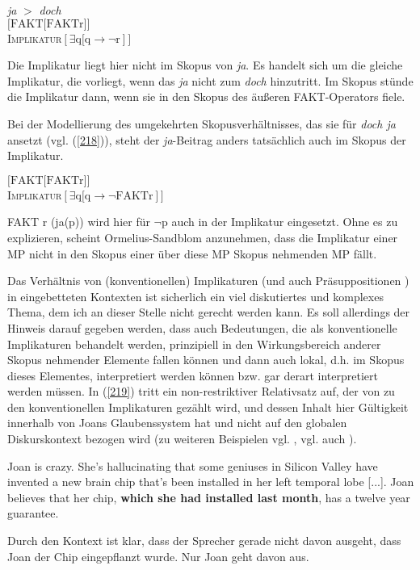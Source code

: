 \begin{exe}
	\ex\label{217}
		\textit{ja} $>$ \textit{doch}\\										
		$[\textrm{FAKT[FAKTr]]}$\\
		\textsc{Implikatur}$[\exists \textrm{q[q} \rightarrow \neg \textrm{r}]]$
\end{exe}
Die Implikatur liegt hier nicht im Skopus von \textit{ja}. Es handelt sich um die gleiche Implikatur, die vorliegt, wenn das \textit{ja} nicht zum \textit{doch} hinzutritt. Im Skopus stünde die Implikatur dann, wenn sie in den Skopus des äußeren FAKT-Operators fiele.

Bei der Modellierung des umgekehrten Skopusverhältnisses, das sie für \textit{doch ja} ansetzt (vgl. (\ref{218})), steht der \textit{ja}-Beitrag anders tatsächlich auch im Skopus der Implikatur.

\begin{exe}
	\ex\label{218}									 
	$\textrm{[FAKT[FAKTr}]]$\\
	\textsc{Implikatur}$[\exists \textrm{q[q} \rightarrow \neg \textrm{FAKTr}]]$
\end{exe}
FAKT r (ja(p)) wird hier für $\neg$p auch in der Implikatur eingesetzt. Ohne es zu explizieren,  scheint Ormelius-Sandblom anzunehmen, dass die Implikatur einer MP  nicht in den Skopus einer über diese MP Skopus nehmenden MP fällt.

Das Verhältnis von (konventionellen) Implikaturen  (und auch Präsuppositionen ) in eingebetteten Kontexten ist sicherlich ein viel diskutiertes und komplexes Thema, dem ich an dieser Stelle nicht gerecht werden kann. Es soll al\-lerdings der Hinweis darauf gegeben werden, dass auch Bedeutungen, die als konventionelle Implikaturen behandelt werden, prinzipiell in den Wirkungsbereich anderer Skopus nehmender Elemente fallen können und dann auch lokal, d.h. im Skopus dieses Elementes, interpretiert werden können bzw. gar derart interpretiert werden müssen. In (\ref{219}) tritt ein non-restriktiver Relativsatz  auf, der von \citet{Potts2005} zu den konventionellen Implikaturen gezählt wird, und dessen Inhalt hier Gültigkeit innerhalb von Joans Glaubenssystem hat und nicht auf den glo\-balen Diskurskontext bezogen wird (zu weiteren Beispielen vgl. \citealt[733-739]{Amaral2007}, vgl. auch \citealt{Harris2009}).

\begin{exe}
	\ex\label{219}									 
	Joan is crazy. She's hallucinating that some geniuses in Silicon Valley have invented a new brain chip that's been installed in her left temporal lobe 	[...]. Joan believes that her chip, \textbf{which she had installed last month}, has a twelve year guarantee.
	\hfill\hbox{\citet[735-736]{Amaral2007}}	
\end{exe}
Durch den Kontext ist klar, dass der Sprecher gerade nicht davon ausgeht, dass Joan der Chip eingepflanzt wurde. Nur Joan geht davon aus.

